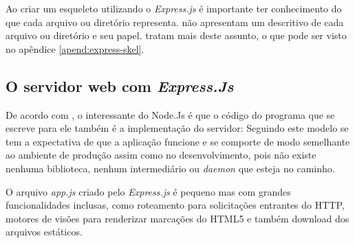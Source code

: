  Ao criar um esqueleto utilizando o \textit{Express.js} é importante ter conhecimento do que cada
  arquivo ou diretório representa.  não apresentam um descritivo de cada arquivo 
  ou diretório e seu papel.  tratam mais deste assunto, o que pode ser visto
  no apêndice \ref{apend:express-skel}.
  
\subsection{O servidor web com \textit{Express.Js}}
\label{servidor-web-express-js}

  
  De acordo com , o interessante do Node.Js é que o código do 
  programa que se escreve para ele também é a implementação do servidor: 
  Seguindo este modelo se tem a expectativa de que a aplicação funcione e se comporte de modo semelhante 
  ao ambiente de produção assim como no desenvolvimento, pois não existe nenhuma biblioteca, nenhum intermediário 
  ou \textit{daemon} que esteja no caminho.
  
  O arquivo \textit{app.js} criado pelo \textit{Express.js} é pequeno mas com grandes funcionalidades inclusas, como 
  roteamento para solicitações entrantes do \ac{HTTP}, motores de visões para renderizar marcações do HTML5
  e também download dos arquivos estáticos.